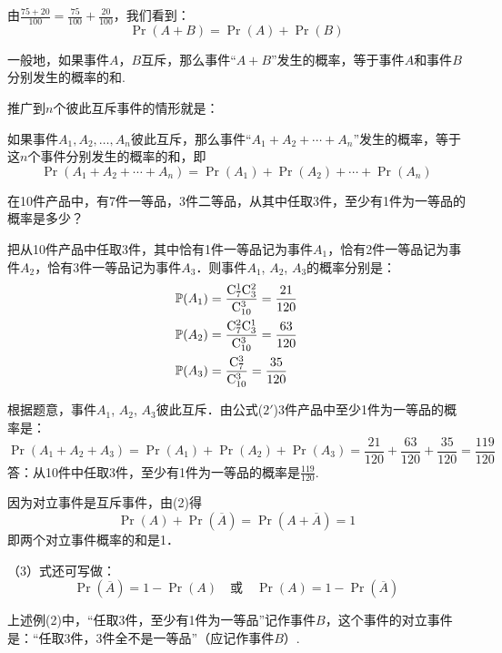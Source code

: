 由$\frac{75+20}{100}=\frac{75}{100}+\frac{20}{100}$，我们看到：
\begin{equation}
\Pr(A+B)=\Pr(A)+\Pr(B) \tag{2}
\end{equation}

一般地，如果事件$A$，$B$互斥，那么事件“$A+B$”发生的概率，等于事件$A$和事件$B$分别发生的概率的和.

推广到$n$个彼此互斥事件的情形就是：

如果事件$A_1,A_2,\ldots,A_n$彼此互斥，那么事件“$A_1+A_2+\cdots+A_n$”发生的概率，等于这$n$个事件分别发生的概率的和，即
\begin{equation}
    \Pr(A_1+A_2+\cdots+A_n)=\Pr(A_1)+\Pr(A_2)+\cdots +\Pr(A_n)\tag{2$'$}
\end{equation}

\begin{example}
    在10件产品中，有7件一等品，3件二等品，从其中任取3件，至少有1件为一等品的概率是多少？
\end{example}

\begin{solution}
    把从10件产品中任取3件，其中恰有1件一等品记为事件$A_1$，恰有2件一等品记为事件$A_2$，恰有3件一等品记为事件$A_3$．则事件$A_1$, $A_2$, $A_3$的概率分别是：
\[\begin{split}
 \Pr(A_1)&=\frac{{\rm C}_7^1{\rm C}_3^2}{{\rm C}_{10}^3}=\frac{21}{120}\\
\Pr(A_2)&=\frac{{\rm C}_7^2{\rm C}_3^1}{{\rm C}_{10}^3}=\frac{63}{120}\\
\Pr(A_3)&=\frac{{\rm C}_7^3}{{\rm C}_{10}^3}=\frac{35}{120}  
\end{split}\]

根据题意，事件$A_1$, $A_2$, $A_3$彼此互斥．由公式($2'$)3件产品中至少1件为一等品的概率是：
\[\Pr(A_1+A_2+A_3)=\Pr(A_1)+\Pr(A_2)+\Pr(A_3)=\frac{21}{120}+\frac{63}{120}+\frac{35}{120}=\frac{119}{120}\]
答：从10件中任取3件，至少有1件为一等品的概率是$\frac{119}{120}$.
\end{solution}


因为对立事件是互斥事件，由(2)得
\begin{equation}
  \Pr(A)+\Pr(\overline{A})=\Pr(A+\overline{A})=1  \tag{3}
\end{equation}
即两个对立事件概率的和是1．

（3）式还可写做：
\begin{equation}
    \Pr(\overline{A})=1-\Pr(A)\quad \text{或}\quad \Pr(A)=1-\Pr(\overline{A}) \tag{$3'$}
\end{equation}

上述例(2)中，“任取3件，至少有1件为一等品”记作事件$B$，这个事件的对立事件是：“任取3件，3件全不是一等品”（应记作事件$B$）.

